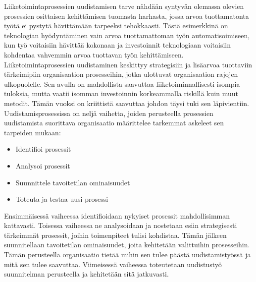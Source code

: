 \documentclass[finnish,12pt,a4paper,pdftex]{article}
\begin{document}
Liiketoimintaprosessien uudistamisen tarve nähdään syntyvän olemassa olevien prosessien osittaisen kehittämisen tuomasta harhasta, jossa arvoa tuottamatonta työtä ei pystytä hävittämään tarpeeksi tehokkaasti. Tästä esimerkkinä on teknologian hyödyntäminen vain arvoa tuottamattoman työn automatisoimiseen, kun työ voitaisiin hävittää kokonaan ja investoinnit teknologiaan voitaisiin kohdentaa vahvemmin arvoa tuottavan työn kehittämiseen. \citep{hammer}\\

Liiketoimintaprosessien uudistaminen keskittyy strategisiin ja lisäarvoa tuottaviin tärkeimipiin organisaation prosesseihin, jotka ulottuvat organisaation rajojen ulkopuolelle. Sen avulla on mahdollista saavuttaa liiketoiminnallisesti isompia tuloksia, mutta vaatii isomman investoinnin korkeammalla riskillä kuin muut metodit. Tämän vuoksi on kriittistä saavuttaa johdon täysi tuki sen läpivientiin.\\

Uudistamisprosessissa on neljä vaihetta, joiden perusteella prosessien uudistamista suorittava organisaatio määrittelee tarkemmat askeleet sen tarpeiden mukaan: \citep{mohapatra}

\begin{itemize}
\setlength{\itemsep}{0pt}
    \item Identifioi prosessit
    \item Analysoi prosessit
    \item Suunnittele tavoitetilan ominaisuudet
    \item Toteuta ja testaa uusi prosessi
\end{itemize}

Ensimmäisessä vaiheessa identifioidaan nykyiset prosessit mahdollisimman kattavasti. Toisessa vaiheessa ne analysoidaan ja nostetaan esiin strategisesti tärkeimmät prosessit, joihin toimenpiteet tulisi kohdistaa. Tämän jälkeen suunnitellaan tavoitetilan ominaisuudet, joita kehitetään valittuihin prosesseihin. Tämän perusteella organisaatio tietää mihin sen tulee päästä uudistamistyössä ja mitä sen tulee saavuttaa. Viimeisessä vaiheessa toteutetaan uudistustyö suunnitelman perusteella ja kehitetään sitä jatkuvasti. \citep{mohapatra}\\





\end{document}
